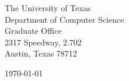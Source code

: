 \begin{minipage}{0.49\textwidth}
\begin{flushleft}
\noindent
The University of Texas\\
Department of Computer Science\\
Graduate Office\\
2317 Speedway, 2.702\\
Austin, Texas 78712
\end{flushleft}
\end{minipage}
\begin{minipage}{0.47\textwidth}
\begin{flushright}
\today
\end{flushright}
\end{minipage} \\

\newcommand{\univ}{The University of Texas at Austin}
\newcommand{\univshort}{UT Austin}
\newcommand{\degree}{Ph.D.}
\newcommand{\dept}{Computer Science}

